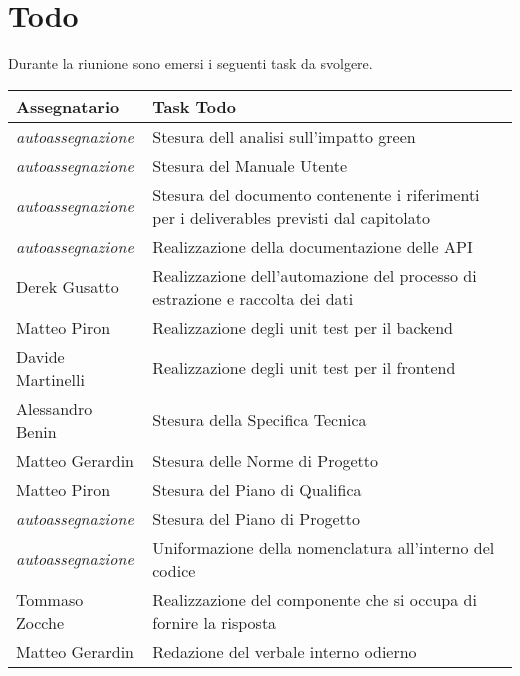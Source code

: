 \section{Todo}
Durante la riunione sono emersi i seguenti task da svolgere.

\begin{center}
  \begin{tabular}{|L{5cm}|L{8cm}|}
    \hline
    \textbf{Assegnatario} & \textbf{Task Todo} \\ \hline
        \textit{autoassegnazione} & Stesura dell analisi sull’impatto green \\ \hline
        \textit{autoassegnazione} & Stesura del Manuale Utente \\ \hline
        \textit{autoassegnazione} & Stesura del documento contenente i riferimenti per i deliverables previsti dal capitolato \\ \hline
        \textit{autoassegnazione} & Realizzazione della documentazione delle API \\ \hline
        Derek Gusatto & Realizzazione dell'automazione del processo di estrazione e raccolta dei dati \\ \hline
        Matteo Piron & Realizzazione degli unit test per il backend \\ \hline
        Davide Martinelli & Realizzazione degli unit test per il frontend \\ \hline
        Alessandro Benin & Stesura della Specifica Tecnica \\ \hline
        Matteo Gerardin & Stesura delle Norme di Progetto \\ \hline
        Matteo Piron & Stesura del Piano di Qualifica \\ \hline
        \textit{autoassegnazione} & Stesura del Piano di Progetto \\ \hline
        \textit{autoassegnazione} & Uniformazione della nomenclatura all’interno del codice \\ \hline
        Tommaso Zocche & Realizzazione del componente che si occupa di fornire la risposta \\ \hline
        Matteo Gerardin & Redazione del verbale interno odierno \\ \hline
  \end{tabular}
\end{center}